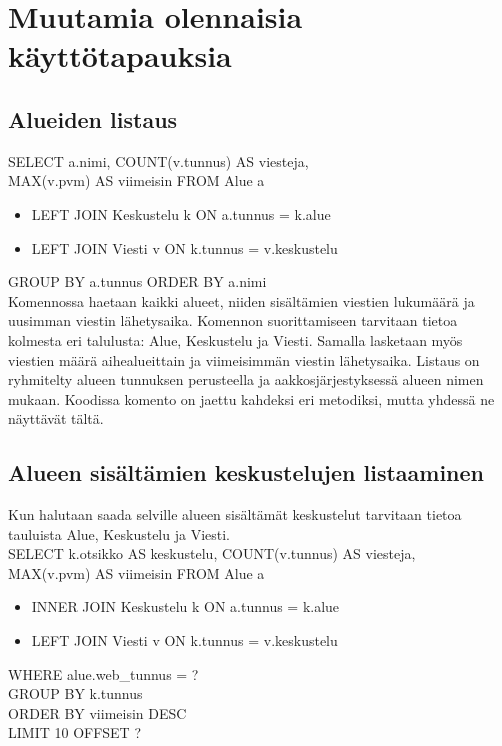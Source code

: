 \documentclass[titlepage]{article}
\begin{document}
\section*{Muutamia olennaisia käyttötapauksia}

\subsection*{Alueiden listaus}

SELECT a.nimi, COUNT(v.tunnus) AS viesteja, \\ MAX(v.pvm) AS viimeisin 
FROM Alue a
\begin{itemize}
	\item[] LEFT JOIN Keskustelu k ON a.tunnus = k.alue
    \item[] LEFT JOIN Viesti v ON k.tunnus = v.keskustelu
\end{itemize}
GROUP BY a.tunnus
ORDER BY a.nimi \\

\noindent
Komennossa haetaan kaikki alueet, niiden sisältämien viestien lukumäärä ja uusimman viestin lähetysaika. Komennon suorittamiseen tarvitaan tietoa kolmesta eri talulusta: Alue, Keskustelu ja Viesti. Samalla lasketaan myös viestien määrä aihealueittain ja viimeisimmän viestin lähetysaika. Listaus on ryhmitelty alueen tunnuksen perusteella ja aakkosjärjestyksessä alueen nimen mukaan. Koodissa komento on jaettu kahdeksi eri metodiksi, mutta yhdessä ne näyttävät tältä. 

\subsection*{Alueen sisältämien keskustelujen listaaminen}

Kun halutaan saada selville alueen sisältämät keskustelut tarvitaan tietoa tauluista Alue, Keskustelu ja Viesti.\\

\noindent SELECT k.otsikko AS keskustelu, COUNT(v.tunnus) AS viesteja, \\ MAX(v.pvm) AS viimeisin 
FROM Alue a
\begin{itemize}
  \item[] INNER JOIN Keskustelu k ON a.tunnus = k.alue
  \item[] LEFT JOIN Viesti v ON k.tunnus = v.keskustelu
\end{itemize}
WHERE alue.web{\_}tunnus = ? \\
GROUP BY k.tunnus \\
ORDER BY viimeisin DESC \\
LIMIT 10 OFFSET ? \\
\end{document}
